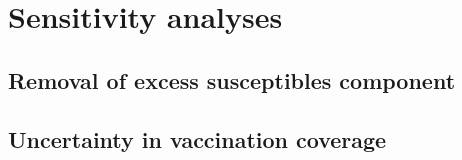 \appendix

\section{Sensitivity analyses}

\subsection{Removal of excess susceptibles component}

\subsection{Uncertainty in vaccination coverage}